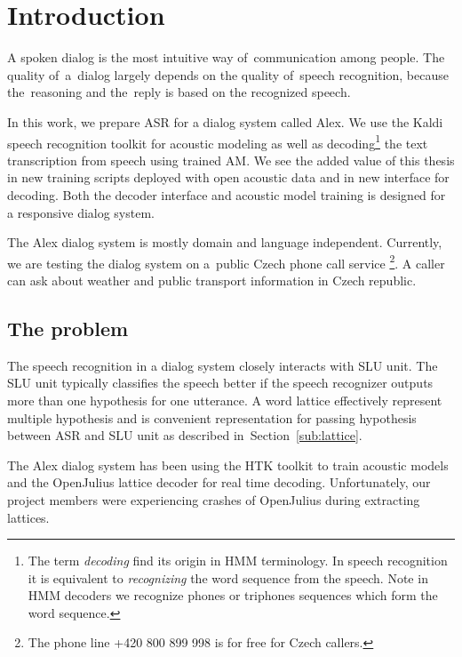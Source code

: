 \chapter{Introduction}
\label{chap:intro}

A spoken dialog is the most intuitive way of~communication among people. 
The quality of~a~dialog largely depends on the quality 
of~speech recognition, because the~reasoning and the~reply is based on the recognized speech. 

In this work, we prepare \acl{ASR} for a dialog system called Alex. 
We use the Kaldi\cite{povey2011kaldi} speech recognition toolkit for acoustic modeling 
as well as decoding\footnote{The term {\it decoding} find its origin in \acs{HMM} terminology. In speech recognition it is equivalent to {\it recognizing} the word sequence from the speech. Note in HMM decoders we recognize phones or triphones sequences which form the word sequence.} the text transcription from speech using trained \acl{AM}.
We see the added value of this thesis in new training scripts deployed with open acoustic data\cite{korvas_2014}
and in new interface for decoding. Both the decoder interface and acoustic model training is designed 
for a responsive dialog system. 

The Alex dialog system is mostly domain and language independent.
Currently, we are testing the dialog system on a~public Czech phone call service
\footnote{The phone line +420 800 899 998 is for free for Czech callers.}.
A caller can ask about weather and public transport information in Czech republic.

\section{The problem} 
\label{sec:problem}

The speech recognition in a dialog system closely interacts with \acl{SLU} unit.
The \ac{SLU} unit typically classifies the speech better 
if the speech recognizer outputs more than one hypothesis for one utterance. 
A word lattice effectively represent multiple hypothesis and is convenient
representation for passing hypothesis between \ac{ASR} and \ac{SLU} unit 
as described in~Section~\ref{sub:lattice}.

The Alex dialog system has been using the \ac{HTK} toolkit\cite{young94htk} 
to train acoustic models and 
the OpenJulius\cite{lee2009julius} lattice decoder for real time decoding. 
Unfortunately, our project members were experiencing crashes 
of OpenJulius during extracting lattices.

